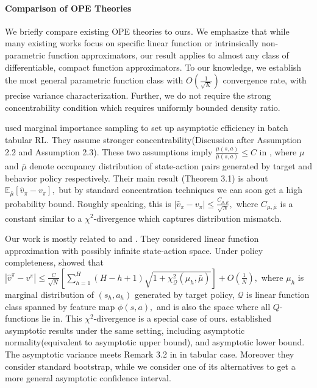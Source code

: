 \documentclass{article}
\numberwithin{equation}{section}
\theoremstyle{plain}
\theoremstyle{definition}
\theoremstyle{remark}
\begin{document}
\paragraph{Comparison of OPE Theories} 
We briefly compare existing OPE theories to ours. We emphasize that while many existing works focus on specific linear function or intrinsically non-parametric function approximators, our result applies to almost any class of differentiable, compact function approximators. To our knowledge, we establish the most general parametric function class with $O(\frac{1}{\sqrt{K}})$ convergence rate, with precise variance characterization. Further, we do not require the strong concentrability condition which requires uniformly bounded density ratio. 


\citep{yin2020asymptotically} used marginal importance sampling to set up asymptotic efficiency in batch tabular RL. They assume stronger concentrability(Discussion after Assumption 2.2 and Assumption 2.3). These two assumptions imply $\frac{\mu(s, a)}{\bar{\mu}(s, a)} \leq C$ in \citep{chen2019information}, where $\mu$ and $\bar{\mu}$ denote occupancy distribution of state-action pairs generated by target and behavior policy respectively. Their main result (Theorem 3.1) is about $\mathbb{E}_{\bar{\mu}}\left[\widehat{v}_{\pi} - v_{\pi}\right],$ but by standard concentration techniques we can soon get a high probability bound. Roughly speaking, this is $\left|\widehat{v}_{\pi} - v_{\pi}\right| \leq \frac{C_{\mu,\bar{\mu}}}{\sqrt{N}},$ where $C_{\mu,\bar{\mu}}$ is a constant similar to a $\chi^2$-divergence which captures distribution mismatch.

Our work is mostly related to \citep{bootstrap} and \citep{duan2020minimax}. They considered linear function approximation with possibly infinite state-action space. Under policy completeness, \citep{duan2020minimax} showed that $\left|\widehat{v}^{\pi}-v^{\pi}\right| \leq \frac{C}{\sqrt{N}} \left[\sum_{h=1}^H (H-h+1) \sqrt{1 + \chi^2_{\mathcal{Q}}(\mu_h,\bar{\mu})}\right] + O(\frac{1}{N}),$ where $\mu_h$ is marginal distribution of $(s_h,a_h)$ generated by target policy, $\mathcal{Q}$ is linear function class spanned by feature map $\phi(s,a),$ and is also the space where all $Q$-functions lie in. This $\chi^2$-divergence is a special case of ours. \citep{bootstrap} established asymptotic results under the same setting, including asymptotic normality(equivalent to asymptotic upper bound), and asymptotic lower bound. The asymptotic variance meets Remark 3.2 in \citep{yin2020asymptotically} in tabular case. Moreover they consider standard bootstrap, while we consider one of its alternatives to get a more general asymptotic confidence interval.
\end{document}
